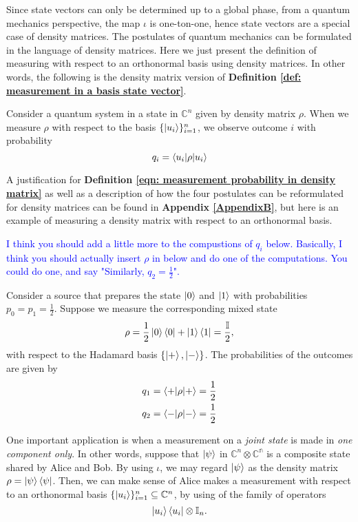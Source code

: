 Since state vectors can only be determined up to a global phase, from a quantum mechanics perspective, the map $\iota$ is one-ton-one, hence state vectors are a special case of density matrices. The postulates of quantum mechanics can be formulated in the language of density matrices. Here we just present the definition of measuring with respect to an orthonormal basis using density matrices. In other words, the following is the density matrix version of \textbf{Definition \ref{def: measurement in a basis state vector}}.


\begin{definition}
Consider a quantum system in a state in $\mathbb{C}^n$ given by density matrix $\rho$.  When we measure $\rho$ with respect to the basis $\{\ket{u_i}\}_{i=1}^n$, we observe outcome $i$ with probability 
\begin{equation} \label{eqn: measurement probability in density matrix}
    q_i=\braket{u_i | \rho |u_i}
\end{equation}
\end{definition}


A justification for \textbf{Definition \ref{eqn: measurement probability in density matrix}} as well as a description of how the four postulates can be reformulated for density matrices can be found in \textbf{Appendix \ref{AppendixB}}, but here is an example of measuring a density matrix with respect to an orthonormal basis.

\textcolor{blue}{I think you should add a little more to the compustions of $q_i$ below.  Basically, I think you should actually insert $\rho$ in below and do one of the computations.  You could do one, and say "Similarly, $q_2=\frac{1}{2}$".}
\begin{example}
Consider a source that prepares the state $\ket{0}$ and $\ket{1}$ with probabilities $p_0=p_1=\frac{1}{2}$. Suppose we measure the corresponding mixed state
$$\rho=\frac{1}{2}\ket{0}\bra{0}+\ket{1}\bra{1}=\frac{\mathbb{I}}{2},$$
with respect to the Hadamard basis $\{\ket{+}, \ket{-}\}$. The probabilities of the outcomes are given by 
\begin{gather}
    q_1=\braket{+|\rho|+}=\frac{1}{2}\\
    q_2=\braket{-|\rho|-}=\frac{1}{2}
\end{gather}
\end{example}


One important application is when a measurement on a {\emph{joint state}} is made in {\emph{one component only}}.  In other words, suppose that $\ket{\psi}$ in $\mathbb{C}^n \otimes \mathbb{C^n}$ is a composite state shared by Alice and Bob.  By using $\iota$, we may regard $\ket{\psi}$ as the density matrix $\rho=\ket{\psi}\bra{\psi}$.  Then, we can make sense of Alice makes a measurement with respect to an orthonormal basis $\{\ket{u_i}\}_{i=1}^n\subseteq {\mathbb{C}}^n$, by using of the family of operators $$\ket{u_i}\bra{u_i} \otimes \mathbb{I}_n.$$ 

